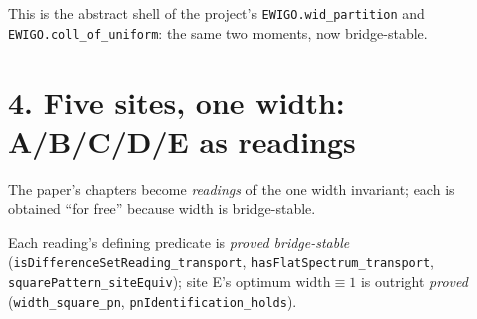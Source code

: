 \documentclass[11pt]{article}
\newcommand{\bC}{\tikz[baseline=-0.6ex]\node[badge,fill=faceC]{C};}
\newcommand{\code}[1]{\texttt{\small #1}}
\begin{document}
\begin{center}\small
This is the abstract shell of the project's \code{EWIGO.wid\_partition} and
\code{EWIGO.coll\_of\_uniform}: the same two moments, now bridge-stable. \checkmark
\end{center}

\section*{4. Five sites, one width: A/B/C/D/E as readings}

The paper's chapters become \emph{readings} of the one width invariant; each is
obtained ``for free'' because width is bridge-stable.

\begin{center}
\end{center}

\begin{center}\small
Each reading's defining predicate is \emph{proved bridge-stable}
(\code{isDifferenceSetReading\_transport}, \code{hasFlatSpectrum\_transport},
\code{squarePattern\_siteEquiv}); site E's optimum $\mathrm{width}\equiv 1$ is
outright \emph{proved} (\code{width\_square\_pn}, \code{pnIdentification\_holds}). \checkmark
\end{center}
\end{document}
